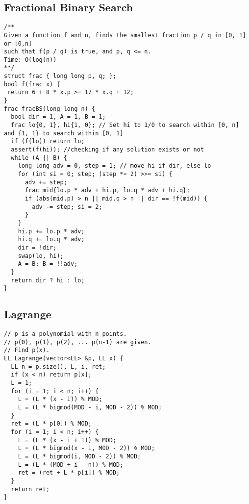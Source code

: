 \documentclass[FSZ,a4paper,onesided]{article}
\begin{document}
\begin{multicols*}{\COLS}
\begin{lstlisting}
\end{lstlisting}
\subsection{Fractional Binary Search}
\begin{lstlisting}
/**
Given a function f and n, finds the smallest fraction p / q in [0, 1] or [0,n]
such that f(p / q) is true, and p, q <= n.
Time: O(log(n))
**/
struct frac { long long p, q; };
bool f(frac x) {
 return 6 + 8 * x.p >= 17 * x.q + 12;
}
frac fracBS(long long n) {
  bool dir = 1, A = 1, B = 1;
  frac lo{0, 1}, hi{1, 0}; // Set hi to 1/0 to search within [0, n] and {1, 1} to search within [0, 1]
  if (f(lo)) return lo;
  assert(f(hi)); //checking if any solution exists or not
  while (A || B) {
    long long adv = 0, step = 1; // move hi if dir, else lo
    for (int si = 0; step; (step *= 2) >>= si) {
      adv += step;
      frac mid{lo.p * adv + hi.p, lo.q * adv + hi.q};
      if (abs(mid.p) > n || mid.q > n || dir == !f(mid)) {
        adv -= step; si = 2;
      } 
    }
    hi.p += lo.p * adv;
    hi.q += lo.q * adv;
    dir = !dir;
    swap(lo, hi);
    A = B; B = !!adv;
  }
  return dir ? hi : lo;
}
\end{lstlisting}
\subsection{Lagrange}
\begin{lstlisting}
// p is a polynomial with n points.
// p(0), p(1), p(2), ... p(n-1) are given.
// Find p(x).
LL Lagrange(vector<LL> &p, LL x) {
  LL n = p.size(), L, i, ret;
  if (x < n) return p[x];
  L = 1;
  for (i = 1; i < n; i++) {
    L = (L * (x - i)) % MOD;
    L = (L * bigmod(MOD - i, MOD - 2)) % MOD;
  }
  ret = (L * p[0]) % MOD;
  for (i = 1; i < n; i++) {
    L = (L * (x - i + 1)) % MOD;
    L = (L * bigmod(x - i, MOD - 2)) % MOD;
    L = (L * bigmod(i, MOD - 2)) % MOD;
    L = (L * (MOD + i - n)) % MOD;
    ret = (ret + L * p[i]) % MOD;
  }
  return ret;
}
\end{lstlisting}

\end{multicols*}
\end{document}
